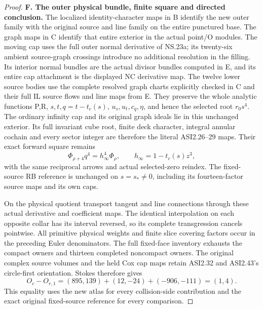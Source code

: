 \begin{proof}
\medskip\noindent\textbf{F. The outer physical bundle, finite square and directed conclusion.}
The localized identity-character maps in B identify the new outer family
with the original source and line family on the entire punctured base.
The graph maps in C identify that entire exterior in the actual point/O
modules.  The moving cap uses the full outer normal derivative of NS.23a;
its twenty-six ambient source-graph crossings introduce no additional
resolution in the filling.  Its interior normal bundles are the actual
divisor bundles computed in E, and its entire cap attachment is the
displayed NC derivative map.  The twelve lower source bodies use the
complete resolved graph charts explicitly checked in C and their full
IL source flows and line maps from E.
They preserve the whole analytic functions P,R, \(s,t,q=t-t_c(s)\),
\(u_s,u_t,c_q,\eta\), and hence the selected root \(r_0s^4\).
The ordinary infinity cap and its original graph ideals lie in this
unchanged exterior.  Its full invariant cube root, finite deck character,
integral annular cochain and every sector integer are therefore the
literal ASI2.26--29 maps.  Their exact forward square remains
\[
                   \Phi_{\rho+4}q^4=h_\infty^4\Phi_\rho,
                   \qquad h_\infty=1-t_c(s)z^3,
\]
with the same reciprocal arrows and actual selected-zero reindex.
The fixed-source RB reference is unchanged on \(s=s_*\ne0\), including
its fourteen-factor source maps and its own caps.

On the physical quotient transport tangent and line connections through
these actual derivative and coefficient maps.  The identical
interpolation on each opposite collar has its interval reversed, so
its complete transgression cancels pointwise.  All primitive physical
weights and finite slice covering factors occur in the preceding
Euler denominators.  The full fixed-face inventory exhausts the compact
owners and thirteen completed noncompact owners.  The original complex
source volumes and the held Cox cap maps retain ASI2.32 and ASI2.43's
circle-first orientation.  Stokes therefore gives
\[
 O_c-O_{r,1}=(895,139)+(12,-24)+(-906,-111)=(1,4).
\]
This equality uses the new atlas for every collision-side contribution
and the exact original fixed-source reference for every comparison.


\end{proof}
